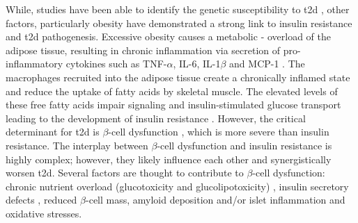 While,  studies have been able to identify the genetic susceptibility to \gls{t2d} \textbf{\cite{grarup_genetic_2014, wang_genetic_2016}}, other factors, particularly obesity have demonstrated a strong link to insulin resistance and \gls{t2d} pathogenesis. Excessive obesity causes a metabolic - overload of the adipose tissue, resulting in chronic inflammation via secretion of pro-inflammatory cytokines such as TNF-$\alpha$, IL-6, IL-1$\beta$ and MCP-1 \textbf{\cite{guilherme_adipocyte_2008}}. The macrophages recruited into the adipose tissue create a chronically inflamed state and reduce the uptake of fatty acids by skeletal muscle. The elevated levels of these free fatty acids impair signaling and insulin-stimulated glucose transport leading to the development of insulin resistance \textbf{\cite{unger_lipotoxicity_1995,uysal_protection_1997,kanda_mcp-1_2006}}. However, the critical determinant for \gls{t2d} is $\beta$-cell dysfunction \textbf{\cite{tahrani_glycaemic_2010, khin_pancreatic_2023}}, which is more severe than insulin resistance. The interplay between $\beta$-cell dysfunction and insulin resistance is highly complex; however, they likely influence each other and synergistically worsen \gls{t2d}.  Several factors are thought to contribute to $\beta$-cell dysfunction: chronic nutrient overload (glucotoxicity and glucolipotoxicity) \textbf{\cite{prentki_nutrient-induced_2020}}, insulin secretory defects \textbf{\cite{kahn_mechanisms_2006}}, reduced $\beta$-cell mass, amyloid deposition \textbf{\cite{prentki_islet_2006}} and/or islet inflammation and oxidative stresses.\\%




